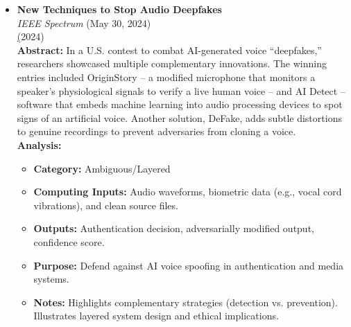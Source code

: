 \documentclass[11pt]{article}
\begin{document}
\begin{itemize}
\item \textbf{New Techniques to Stop Audio Deepfakes} \\
\textit{IEEE Spectrum} (May 30, 2024)\\
\href{https://technews.acm.org/archives.cfm?fo=2024-05-may#48} (2024)\\
\textbf{Abstract:} In a U.S. contest to combat AI-generated voice “deepfakes,” researchers showcased multiple complementary innovations. The winning entries included OriginStory – a modified microphone that monitors a speaker’s physiological signals to verify a live human voice – and AI Detect – software that embeds machine learning into audio processing devices to spot signs of an artificial voice. Another solution, DeFake, adds subtle distortions to genuine recordings to prevent adversaries from cloning a voice.\\
\textbf{Analysis:}\\
\begin{itemize}
\item \textbf{Category:} Ambiguous/Layered
\item \textbf{Computing Inputs:} Audio waveforms, biometric data (e.g., vocal cord vibrations), and clean source files.
\item \textbf{Outputs:} Authentication decision, adversarially modified output, confidence score.
\item \textbf{Purpose:} Defend against AI voice spoofing in authentication and media systems.
\item \textbf{Notes:} Highlights complementary strategies (detection vs. prevention). Illustrates layered system design and ethical implications.
\end{itemize}


\end{itemize}
\end{document}
